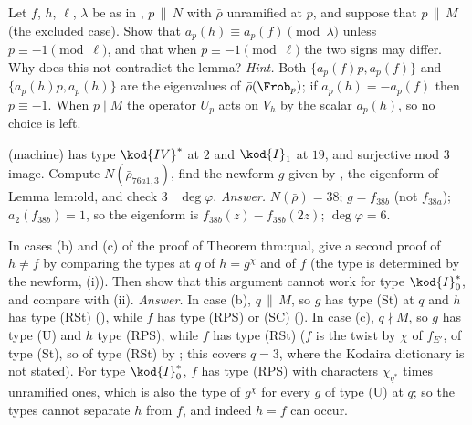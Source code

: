 \begin{exercise}\label{exer:modgalrep:old-hypothesis}
Let $f$, $h$, $\ell$, $\lambda$ be as in , $p\,\|\,N$ with $\bar\rho$ unramified at $p$, and suppose that $p\,\|\,M$ (the excluded case). Show that $a_p(h)\equiv a_p(f)\pmod\lambda$ unless
$p\equiv-1\pmod\ell$, and that when $p\equiv-1\pmod\ell$ the two signs may differ. Why does this not contradict the lemma? \emph{Hint.} Both $\{a_p(f)p,a_p(f)\}$ and $\{a_p(h)p,a_p(h)\}$
are the eigenvalues of $\bar\rho(\Frob_p)$; if $a_p(h)=-a_p(f)$ then $p\equiv-1$. When $p\mid M$ the operator $U_p$ acts on $V_h$ by the scalar $a_p(h)$, so no choice is left.
\end{exercise}

\begin{exercise}[case (a) at $q=2$: \curve{76a1}]\label{exer:modgalrep:76a1}
(machine)  has type $\kod{IV}^*$ at $2$ and $\kod{I}_1$ at $19$, and surjective mod $3$ image. Compute $N(\bar\rho_{76a1,3})$, find the newform $g$ given by ,
the eigenform of Lemma lem:old, and check $3\mid\deg\varphi$. \emph{Answer.} $N(\bar\rho)=38$; $g=f_{38b}$ (not $f_{38a}$); $a_2(f_{38b})=1$, so the eigenform is $f_{38b}(z)-f_{38b}(2z)$;
$\deg\varphi=6$.
\end{exercise}

\begin{exercise}\label{exer:modgalrep:h-ne-f}
In cases (b) and (c) of the proof of Theorem thm:qual, give a second proof of $h\ne f$ by comparing the types at $q$ of $h=g^\chi$ and of $f$ (the type is determined by the
newform, (i)). Then show that this argument cannot work for type $\kod{I}_0^*$, and compare with (ii).
\emph{Answer.} In case (b), $q\,\|\,M$, so $g$ has type (St) at $q$ and $h$ has type (RSt) (), while $f$ has type (RPS) or (SC)
(). In case (c), $q\nmid M$, so $g$ has type (U) and $h$ type (RPS), while $f$ has type (RSt) ($f$ is the twist by $\chi$ of $f_{E'}$, of type (St), so of type (RSt) by
; this covers $q=3$, where the Kodaira dictionary is not stated). For type $\kod{I}_0^*$, $f$ has type (RPS) with
characters $\chi_{q^*}$ times unramified ones, which is also the type of $g^\chi$ for every $g$ of type (U) at $q$; so the types cannot separate $h$ from $f$, and indeed $h=f$ can occur.
\end{exercise}

